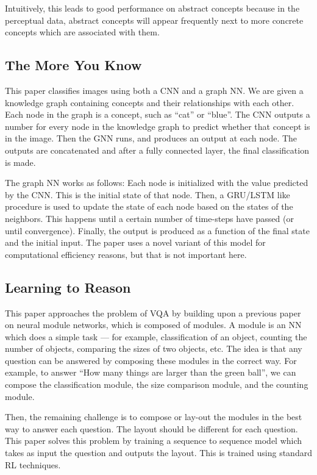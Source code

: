 \documentclass[12pt]{article}
\begin{document}
Intuitively, this leads to good performance on abstract concepts because in the perceptual data, abstract concepts will appear frequently next to more concrete concepts which are associated with them. 

\subsection{The More You Know \cite{TheMoreYouKnow}}

This paper classifies images using both a CNN and a graph NN.  We are given a knowledge graph containing concepts and their relationships with each other. Each node in the graph is a concept, such as ``cat'' or ``blue''. The CNN outputs a number for every node in the knowledge graph to predict whether that concept is in the image. Then the GNN runs, and produces an output at each node. The outputs are concatenated and after a fully connected layer, the final classification is made.

The graph NN works as follows: Each node is initialized with the value predicted by the CNN. This is the initial state of that node. Then, a GRU/LSTM like procedure is used to update the state of each node based on the states of the neighbors. This happens until a certain number of time-steps have passed (or until convergence). Finally, the output is produced as a function of the final state and the initial input. The paper uses a novel variant of this model for computational efficiency reasons, but that is not important here.

\subsection{Learning to Reason \cite{LearningToReason}}

This paper approaches the problem of VQA by building upon a previous paper on neural module networks, which is composed of modules. A module is an NN which does a simple task — for example, classification of an object, counting the number of objects, comparing the sizes of two objects, etc. The idea is that any question can be answered by composing these modules in the correct way. For example, to answer “How many things are larger than the green ball”, we can compose the classification module, the size comparison module, and the counting module. 

Then, the remaining challenge is to compose or lay-out the modules in the best way to answer each question. The layout should be different for each question. This paper solves this problem by training a sequence to sequence model which takes as input the question and outputs the layout. This is trained using standard RL techniques.
\end{document}

